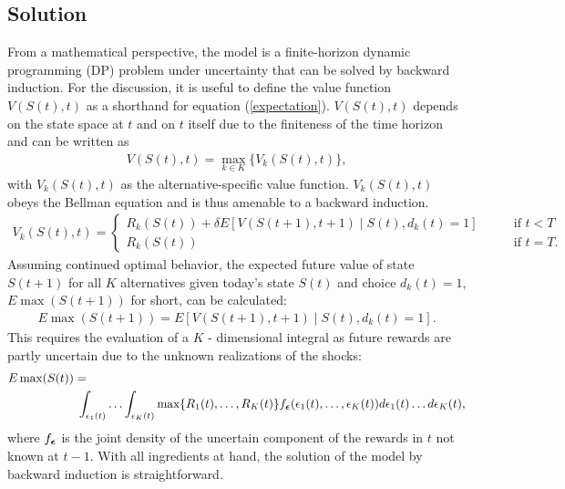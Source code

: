 \subsection{Solution}
From a mathematical perspective, the model is a finite-horizon dynamic programming (DP) problem under uncertainty that can be solved by backward induction. For the discussion, it is useful to define the value function $V(S(t),t)$ as a shorthand for equation (\ref{expectation}). $V(S(t),t)$ depends on the state space at $t$ and on $t$ itself due to the finiteness of the time horizon and can be written as
%
\begin{align*}
V(S(t),t) = \max_{k \in K}\{V_k(S(t),t)\},
\end{align*}
%
with $V_k(S(t),t)$ as the alternative-specific value function. $V_k(S(t),t)$ obeys the Bellman equation \citep{Bellman.1957} and is thus amenable to a backward induction.
%
\begin{align*}
V_k(S(t),t) = \begin{cases} R_k(S(t)) + \delta E\left[V(S(t + 1), t + 1) \mid S(t), d_k(t) = 1\right] &\qquad\mbox{if } t < T \\
R_k(S(t)) &\qquad\mbox{if } t = T.
\end{cases}
\end{align*}
%
Assuming continued optimal behavior, the expected future value of state $S(t + 1)$ for all $K$ alternatives given today's state $S(t)$ and choice $d_k(t) = 1$, $E\max(S(t + 1))$ for short, can be calculated:
%
\begin{align*}
E\max(S(t + 1)) = E\left[V(S(t + 1), t + 1) \mid S(t), d_k(t) = 1\right].
\end{align*}
%
This requires the evaluation of a $K$ - dimensional integral as future rewards are partly uncertain due to the unknown realizations of the shocks:
%
\begin{align*}
\nonumber E\max(S(t)) =\hspace{11cm}\\
\int_{\epsilon_1(t)}\hdots\int_{\epsilon_K(t)}\max\{R_1(t), \hdots, R_K(t)\}f_{\bs\epsilon}(\epsilon_1(t),\hdots,\epsilon_K(t))d\epsilon_1(t)\hdots d\epsilon_K(t),
\end{align*}
where $f_{\boldsymbol\epsilon}$ is the joint density of the uncertain component of the rewards in $t$ not known at $t - 1$. With all ingredients at hand, the solution of the model by backward induction is straightforward.
